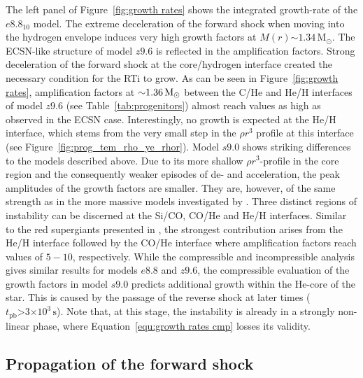 \documentclass[fleqn,usenatbib]{mnras}
\newcommand{\tpb}{\ensuremath{t_{\text{pb}}}}
\newcommand{\solm}{\ensuremath{\rm{M_{\odot}}}\xspace}
\newcommand{\s}{\ensuremath{\text{s}}}
\newcommand{\GEO}[1]{{\color{red}#1}}
\begin{document}
The left panel of Figure~\ref{fig:growth rates} shows the integrated growth-rate of the $e8.8_{10}$ model.
The extreme deceleration of the forward shock when moving into the hydrogen envelope induces very high growth factors at $M(r)\mathord{\sim}1.34\,\mathrm{M_{\odot}}$.
The ECSN-like structure of model $z9.6$ is reflected in the amplification factors.
Strong deceleration of the forward shock at the core/hydrogen interface created the necessary condition for the RTi to grow. As can be seen in Figure~\ref{fig:growth rates}, amplification factors at $\mathord{\sim}1.36\,\solm$ between the C/He and He/H interfaces of model $z9.6$ (see Table~\ref{tab:progenitors}) almost reach values as high as observed in the ECSN case. Interestingly, no growth is expected at the He/H interface, which stems from the very small step in the $\rho r^3$ profile at this interface (see Figure~\ref{fig:prog_tem_rho_ye_rhor}).
Model $s9.0$ shows striking differences to the models described above. 
Due to its more shallow $\rho r^3$-profile in the core region and the consequently weaker episodes of de- and acceleration, the peak amplitudes of the growth factors are smaller. They are, however, of the same strength as in the more massive models investigated by \cite{Wongwathanarat2015}. 
\GEO{
Three distinct regions of instability can be discerned at the Si/CO, CO/He and He/H interfaces. 
Similar to the red supergiants presented in \citet{Wongwathanarat2015}, the strongest contribution arises from the He/H interface followed by the CO/He interface where amplification factors  reach values of $5-10$, respectively. 
While the compressible and incompressible analysis gives similar results for models $e8.8$ and $z9.6$, the compressible evaluation of the growth factors in model $s9.0$ predicts additional growth within the He-core of the star. This is caused by the passage of the reverse shock at later times ($\tpb\mathord{>}3\mathord{\times}10^3\,\s$). Note that, at this stage, the instability is already in a strongly non-linear phase, where Equation~\ref{equ:growth rates cmp} losses its validity.
}
\subsection{Propagation of the forward shock}
\end{document}
